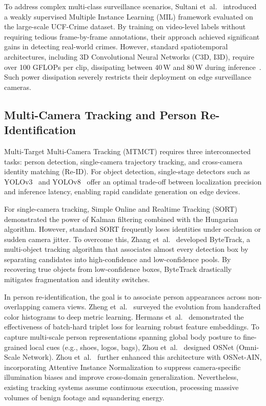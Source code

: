 \documentclass[12pt,a4paper]{report}
\begin{document}
To address complex multi-class surveillance scenarios, Sultani et~al.~\cite{ref_sultani2018_ucfcrime} introduced a weakly supervised Multiple Instance Learning (MIL) framework evaluated on the large-scale UCF-Crime dataset. By training on video-level labels without requiring tedious frame-by-frame annotations, their approach achieved significant gains in detecting real-world crimes. However, standard spatiotemporal architectures, including 3D Convolutional Neural Networks (C3D, I3D), require over 100 GFLOPs per clip, dissipating between $40\,\text{W}$ and $80\,\text{W}$ during inference~\cite{ref_sultani2018_ucfcrime}. Such power dissipation severely restricts their deployment on edge surveillance cameras.

\subsection{Multi-Camera Tracking and Person Re-Identification}
Multi-Target Multi-Camera Tracking (MTMCT) requires three interconnected tasks: person detection, single-camera trajectory tracking, and cross-camera identity matching (Re-ID). For object detection, single-stage detectors such as YOLOv3~\cite{ref_redmon2018_yolov3} and YOLOv8~\cite{ref_jocher2023_yolov8} offer an optimal trade-off between localization precision and inference latency, enabling rapid candidate generation on edge devices.

For single-camera tracking, Simple Online and Realtime Tracking (SORT)~\cite{ref_bewley2016_sort} demonstrated the power of Kalman filtering combined with the Hungarian algorithm. However, standard SORT frequently loses identities under occlusion or sudden camera jitter. To overcome this, Zhang et~al.~\cite{ref_zhang2022_bytetrack} developed ByteTrack, a multi-object tracking algorithm that associates almost every detection box by separating candidates into high-confidence and low-confidence pools. By recovering true objects from low-confidence boxes, ByteTrack drastically mitigates fragmentation and identity switches.

In person re-identification, the goal is to associate person appearances across non-overlapping camera views. Zheng et~al.~\cite{ref_zheng2016_reid_survey} surveyed the evolution from handcrafted color histograms to deep metric learning. Hermans et~al.~\cite{ref_hermans2017_triplet} demonstrated the effectiveness of batch-hard triplet loss for learning robust feature embeddings. To capture multi-scale person representations spanning global body posture to fine-grained local cues (e.g., shoes, logos, bags), Zhou et~al.~\cite{ref_zhou2019_osnet} designed OSNet (Omni-Scale Network). Zhou et~al.~\cite{ref_zhou2021_osnet_ain} further enhanced this architecture with OSNet-AIN, incorporating Attentive Instance Normalization to suppress camera-specific illumination biases and improve cross-domain generalization. Nevertheless, existing tracking systems assume continuous execution, processing massive volumes of benign footage and squandering energy.
\end{document}
